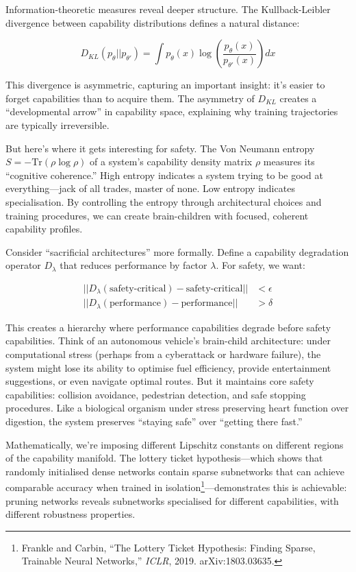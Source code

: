 Information-theoretic measures reveal deeper structure.
The Kullback-Leibler divergence between capability distributions defines a natural distance:

\begin{equation}
D_{KL}(p_\theta || p_{\theta'}) = \int p_\theta(x) \log\left(\frac{p_\theta(x)}{p_{\theta'}(x)}\right) dx
\end{equation}

This divergence is asymmetric, capturing an important insight: it's easier to forget capabilities than to acquire them. The asymmetry of $D_{KL}$ creates a ``developmental arrow'' in capability space, explaining why training trajectories are typically irreversible.

But here's where it gets interesting for safety. The Von Neumann entropy $S = -\text{Tr}(\rho \log \rho)$ of a system's capability density matrix $\rho$ measures its ``cognitive coherence.'' High entropy indicates a system trying to be good at everything---jack of all trades, master of none. Low entropy indicates specialisation. By controlling the entropy through architectural choices and training procedures, we can create brain-children with focused, coherent capability profiles.

Consider ``sacrificial architectures'' more formally. Define a capability degradation operator $D_\lambda$ that reduces performance by factor $\lambda$. For safety, we want:

\begin{align}
||D_\lambda(\text{safety-critical}) - \text{safety-critical}|| &< \epsilon \\ ||D_\lambda(\text{performance}) - \text{performance}|| &> \delta
\end{align}

This creates a hierarchy where performance capabilities degrade before safety capabilities.
Think of an autonomous vehicle's brain-child architecture: under computational stress (perhaps from a cyberattack or hardware failure), the system might lose its ability to optimise fuel efficiency, provide entertainment suggestions, or even navigate optimal routes.
But it maintains core safety capabilities: collision avoidance, pedestrian detection, and safe stopping procedures.
Like a biological organism under stress preserving heart function over digestion, the system preserves ``staying safe'' over ``getting there fast.''

Mathematically, we're imposing different Lipschitz constants on different regions of the capability manifold.
The lottery ticket hypothesis---which shows that randomly initialised dense networks contain sparse subnetworks that can achieve comparable accuracy when trained in isolation\footnote{Frankle and Carbin, ``The Lottery Ticket Hypothesis: Finding Sparse, Trainable Neural Networks,'' \textit{ICLR}, 2019. arXiv:1803.03635.}---demonstrates this is achievable: pruning networks reveals subnetworks specialised for different capabilities, with different robustness properties.

